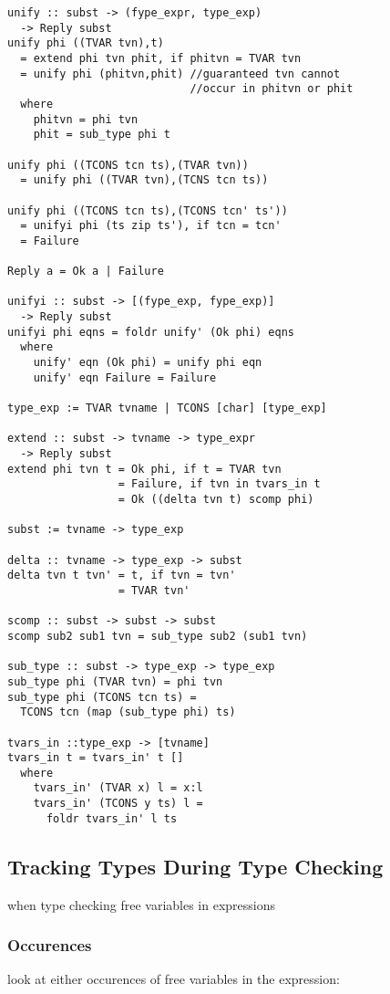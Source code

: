 \documentclass[8pt]{extarticle}
\begin{document}
\begin{multicols*}{2}
\begin{verbatim}
unify :: subst -> (fype_expr, type_exp)
  -> Reply subst
unify phi ((TVAR tvn),t)
  = extend phi tvn phit, if phitvn = TVAR tvn
  = unify phi (phitvn,phit) //guaranteed tvn cannot
                            //occur in phitvn or phit
  where
    phitvn = phi tvn
    phit = sub_type phi t

unify phi ((TCONS tcn ts),(TVAR tvn))
  = unify phi ((TVAR tvn),(TCNS tcn ts))

unify phi ((TCONS tcn ts),(TCONS tcn' ts'))
  = unifyi phi (ts zip ts'), if tcn = tcn'
  = Failure

Reply a = Ok a | Failure

unifyi :: subst -> [(fype_exp, fype_exp)]
  -> Reply subst
unifyi phi eqns = foldr unify' (Ok phi) eqns
  where
    unify' eqn (Ok phi) = unify phi eqn
    unify' eqn Failure = Failure

type_exp := TVAR tvname | TCONS [char] [type_exp]

extend :: subst -> tvname -> type_expr
  -> Reply subst
extend phi tvn t = Ok phi, if t = TVAR tvn
                 = Failure, if tvn in tvars_in t
                 = Ok ((delta tvn t) scomp phi)

subst := tvname -> type_exp

delta :: tvname -> type_exp -> subst
delta tvn t tvn' = t, if tvn = tvn'
                 = TVAR tvn'

scomp :: subst -> subst -> subst
scomp sub2 sub1 tvn = sub_type sub2 (sub1 tvn)

sub_type :: subst -> type_exp -> type_exp
sub_type phi (TVAR tvn) = phi tvn
sub_type phi (TCONS tcn ts) =
  TCONS tcn (map (sub_type phi) ts)

tvars_in ::type_exp -> [tvname]
tvars_in t = tvars_in' t []
  where
    tvars_in' (TVAR x) l = x:l
    tvars_in' (TCONS y ts) l =
      foldr tvars_in' l ts
\end{verbatim}

\vfill\null
\columnbreak

\subsection{Tracking Types During Type Checking}

when type checking free variables in expressions

\subsubsection{Occurences}
look at either occurences of free variables in the expression:


\end{multicols*}
\end{document}
